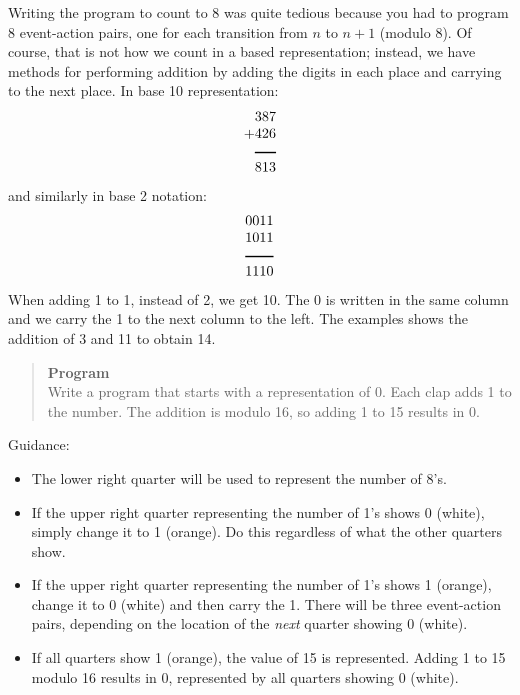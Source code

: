 Writing the program to count to 8 was quite tedious because you had to
program 8 event-action pairs, one for each transition from $n$ to $n+1$
(modulo 8). Of course, that is not how we count in a based
representation;
instead, we have methods for performing addition by adding the digits
in each place and carrying to the next place. In base 10
representation:
\begin{displaymath}
\begin{array}{r}
387\\
+426\\
\rule[1pt]{1.5em}{1pt}\\
813\\
\end{array}
\end{displaymath}
and similarly in base 2 notation:
\begin{displaymath}
\begin{array}{r}
0011\\
1011\\
\rule[1pt]{2em}{1pt}\\
1110\\
\end{array}
\end{displaymath}
When adding 1 to 1, instead of 2, we get 10.
The 0 is written in the same column and we carry the 1 to the next
column to the left.
The examples shows the addition of 3 and 11 to obtain 14.

\begin{quote}
\textbf{Program}\\
Write a program that starts with a representation of 0.
Each clap adds 1 to the number.
The addition is modulo 16, so adding 1 to 15 results in 0.
\end{quote}

Guidance:

\begin{itemize}
\item The lower right quarter will be used to represent the number of 8's.
\item If the upper right quarter representing the number
of 1's shows 0 (white),
simply change it to 1 (orange). Do this regardless of what the other
quarters show.
\item If the upper right quarter representing the number of 1's
shows 1 (orange),
change it to 0 (white) and then carry the 1.
There will be three event-action pairs,
depending on the location of the \emph{next} quarter showing 0
(white).
\item If all quarters show 1 (orange), the value of 15 is represented.
Adding 1 to 15 modulo 16 results in 0, represented by all quarters
showing 0 (white).
\end{itemize}


